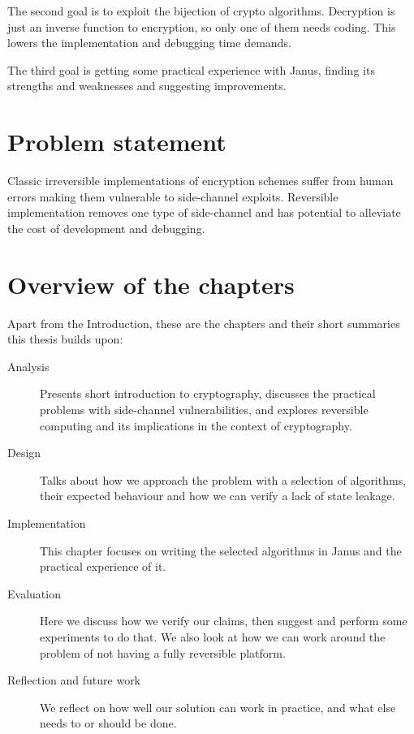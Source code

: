 \documentclass[a4paper,10pt,openright]{memoir}
\begin{document}
The second goal is to exploit the bijection of crypto algorithms. 
Decryption is just an inverse function to encryption, so only one of them 
needs coding. This lowers the implementation and debugging time demands.

The third goal is getting some practical experience with Janus, finding 
its strengths and weaknesses and suggesting improvements.

\section{Problem statement}

Classic irreversible implementations of encryption schemes suffer from 
human errors making them vulnerable to side-channel exploits. 
Reversible implementation removes one type of side-channel and has 
potential to alleviate the cost of development and debugging.

\section{Overview of the chapters}

Apart from the Introduction, these are the chapters and their short 
summaries this thesis builds upon:

\begin{description}

\item[Analysis] Presents short introduction to cryptography, discusses 
the practical problems with side-channel vulnerabilities, and explores 
reversible computing and its implications in the context of 
cryptography.

\item[Design] Talks about how we approach the problem with a selection 
of algorithms, their expected behaviour and how we can verify a lack of 
state leakage.

\item[Implementation] This chapter focuses on writing the selected 
algorithms in Janus and the practical experience of it.

\item[Evaluation] Here we discuss how we verify our claims, then 
suggest and perform some experiments to do that. We also look at how we 
can work around the problem of not having a fully reversible platform.

\item[Reflection and future work] We reflect on how well our solution 
can work in practice, and what else needs to or should be done. 

\end{description}
\end{document}
